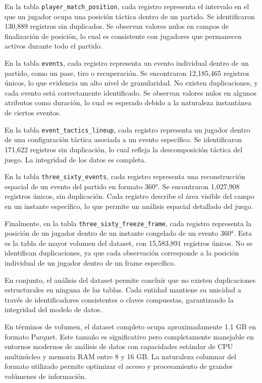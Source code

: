 \documentclass[12pt,a4paper]{article}
\begin{document}
En la tabla \texttt{player\_match\_position}, cada registro representa el intervalo en el que un jugador ocupa una posición táctica dentro de un partido. Se identificaron 130,889 registros sin duplicados. Se observan valores nulos en campos de finalización de posición, lo cual es consistente con jugadores que permanecen activos durante todo el partido.

En la tabla \texttt{events}, cada registro representa un evento individual dentro de un partido, como un pase, tiro o recuperación. Se encontraron 12,185,465 registros únicos, lo que evidencia un alto nivel de granularidad. No existen duplicaciones, y cada evento está correctamente identificado. Se observan valores nulos en algunos atributos como duración, lo cual es esperado debido a la naturaleza instantánea de ciertos eventos.

En la tabla \texttt{event\_tactics\_lineup}, cada registro representa un jugador dentro de una configuración táctica asociada a un evento específico. Se identificaron 171,622 registros sin duplicación, lo cual refleja la descomposición táctica del juego. La integridad de los datos es completa.

En la tabla \texttt{three\_sixty\_events}, cada registro representa una reconstrucción espacial de un evento del partido en formato 360°. Se encontraron 1,027,908 registros únicos, sin duplicación. Cada registro describe el área visible del campo en un instante específico, lo que permite un análisis espacial detallado del juego.

Finalmente, en la tabla \texttt{three\_sixty\_freeze\_frame}, cada registro representa la posición de un jugador dentro de un instante congelado de un evento 360°. Esta es la tabla de mayor volumen del dataset, con 15,583,891 registros únicos. No se identifican duplicaciones, ya que cada observación corresponde a la posición individual de un jugador dentro de un frame específico.

En conjunto, el análisis del dataset permite concluir que no existen duplicaciones estructurales en ninguna de las tablas. Cada entidad mantiene su unicidad a través de identificadores consistentes o claves compuestas, garantizando la integridad del modelo de datos.

En términos de volumen, el dataset completo ocupa aproximadamente 1.1 GB en formato Parquet. Este tamaño es significativo pero completamente manejable en entornos modernos de análisis de datos con capacidades estándar de CPU multinúcleo y memoria RAM entre 8 y 16 GB. La naturaleza columnar del formato utilizado permite optimizar el acceso y procesamiento de grandes volúmenes de información.
\end{document}
